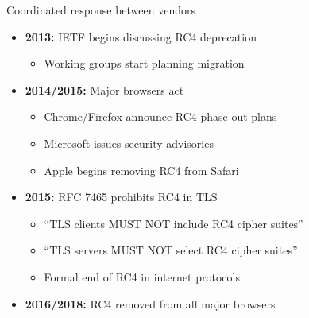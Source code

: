 \documentclass[aspectratio=169, lualatex, handout]{beamer}
\begin{document}
\begin{frame}{Coordinated response between vendors}
	\begin{itemize}
		\item \textbf{2013:} IETF begins discussing RC4 deprecation
		      \begin{itemize}
			      \item Working groups start planning migration
		      \end{itemize}
		\item \textbf{2014/2015:} Major browsers act
		      \begin{itemize}
			      \item Chrome/Firefox announce RC4 phase-out plans
			      \item Microsoft issues security advisories
			      \item Apple begins removing RC4 from Safari
		      \end{itemize}
		\item \textbf{2015:} RFC 7465 prohibits RC4 in TLS
		      \begin{itemize}
			      \item ``TLS clients MUST NOT include RC4 cipher suites''
			      \item ``TLS servers MUST NOT select RC4 cipher suites''
			      \item Formal end of RC4 in internet protocols
		      \end{itemize}
		\item \textbf{2016/2018:} RC4 removed from all major browsers
	\end{itemize}
\end{frame}
\end{document}
